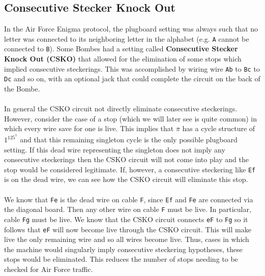 \subsection{Consecutive Stecker Knock Out}
In the Air Force Enigma protocol, the plugboard setting was always
such that no letter was connected to its neighboring letter in the
alphabet (e.g. \texttt{A} cannot be connected to \texttt{B}). Some
Bombes had a setting called {\bf{Consecutive Stecker Knock Out
(CSKO)}} that allowed for the elimination of some stops which implied
consecutive steckerings. This was accomplished by wiring wire
\texttt{Ab} to \texttt{Bc} to \texttt{Dc} and so on, with an optional
jack that could complete the circuit on the back of the Bombe.
\\\\In general the CSKO circuit not directly eliminate consecutive
steckerings. However, consider the case of a stop (which we will
later see is quite common) in which every wire save for one is live.
This implies that $\overline\pi$ has a cycle structure of $1^125^1$
and that this remaining singleton cycle is the only possible
plugboard setting. If this dead wire representing the singleton does
not imply any consecutive steckerings then the CSKO circuit will not
come into play and the stop would be considered legitimate. If,
however, a consecutive steckering like \texttt{Ef} is on the dead
wire, we can see how the CSKO circuit will eliminate this stop.
\\\\We know that \texttt{Fe} is the dead wire on cable \texttt{F},
since \texttt{Ef} and \texttt{Fe} are connected via the diagonal
board. Then any other wire on cable \texttt{F} must be live. In
particular, cable \texttt{Fg} must be live. We know that the CSKO
circuit connects \texttt{eF} to \texttt{Fg} so it follows that
\texttt{eF} will now become live through the CSKO circuit. This will
make live the only remaining wire and so all wires become live. Thus,
cases in which the machine would singularly imply consecutive
steckering hypotheses, these stops would be eliminated. This reduces
the number of stops needing to be checked for Air Force traffic.

